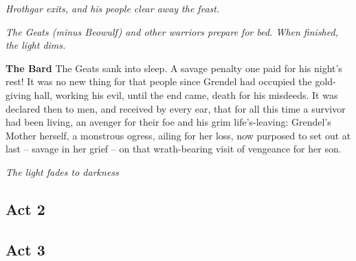 \documentclass[a4paper]{article}
\begin{document}
{\centerline{\textit{Hrothgar exits, and his people clear away the feast.}}
\centerline{\textit{The Geats (minus Beowulf) and other warriors prepare for bed. When finished, the light dims.}}

\textbf{The Bard} The Geats sank into sleep. A savage penalty
one paid for his night’s rest! It was no new thing for that people
since Grendel had occupied the gold-giving hall,
working his evil, until the end came,
death for his misdeeds. It was declared then to men,
and received by every ear, that for all this time
a survivor had been living, an avenger for their foe
and his grim life’s-leaving: Grendel’s Mother herself,
a monstrous ogress, ailing for her loss,
now purposed to set out at last – savage in her grief –
on that wrath-bearing visit of vengeance for her son.

\centerline{\textit{The light fades to darkness}}

\subsection{Act 2}%

\subsection{Act 3}%

}
\end{document}
